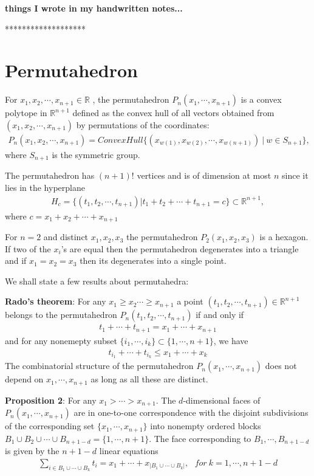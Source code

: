 \documentclass[hidelinks,12pt]{article}
\newcommand{\bea}[1]{\begin{eqnarray}\label{#1} }
\newcommand{\eea}{\end{eqnarray}}
\def\bea{\begin{eqnarray}}
\def\eea{\end{eqnarray}}
\begin{document}
{\bf things I wrote in my handwritten notes...}

*******************

\section*{Permutahedron}
 For $x_1,x_2, \cdots, x_{n+1} \in \mathbb{R} $ , the permutahedron $P_n(x_1,\cdots,x_{n+1})$ is a convex polytope in $\mathbb{R}^{n+1}$ defined as the convex hull of all vectors obtained from $(x_1,x_2, \cdots, x_{n+1})$ by permutations of the coordinates:
 \bea
 P_n(x_1,x_2, \cdots, x_{n+1}) = ConvexHull \{ (x_{w(1)},x_{w(2)}, \cdots, x_{w(n+1)})~ |~ w \in S_{n+1} \}, \nonumber
 \eea
 where $S_{n+1}$ is the symmetric group. 
 
 The permutahedron has $(n+1)!$ vertices and is of dimension at most $n$ since it lies in the hyperplane 
 \bea
 H_c= \{(t_1,t_2, \cdots, t_{n+1}) | t_1 + t_2 + \cdots + t_{n+1}= c \} \subset \mathbb{R}^{n+1}, \nonumber
 \eea
where $c= x_1+x_2+ \cdots +x_{n+1}$

For $n=2$ and distinct $x_1,x_2, x_3$ the permutahedron $P_2(x_1,x_2, x_3)$ is a hexagon. If two of the $x_i$'s are equal then the permutahedron degenerates into a triangle and if $x_1= x_2 = x_3$ then its degenerates into a single point.

We shall state a few results about permutahedra:

{\bf Rado's theorem}: For any $x_1 \ge x_2  \cdots \ge x_{n+1}$ a point $(t_1,t_2, \cdots, t_{n+1}) \in \mathbb{R}^{n+1}$ belongs to the permutahedron $P_n(t_1,t_2, \cdots, t_{n+1})$ if and only if 
\bea
t_1+ \cdots +t_{n+1} = x_1 +\cdots+ x_{n+1} \nonumber
\eea
and for any nonemepty subset $\{i_1,\cdots,i_k \} \subset \{1,\cdots, n+1 \}$, we have 
\bea
t_{i_1}+ \cdots +t_{i_k} \leq x_1 +\cdots+ x_k \nonumber
\eea
The combinatorial structure of the permutahedron $P_n (x_1, \cdots, x_{n+1}) $ does not depend on $ x_1, \cdots, x_{n+1} $ as long as all these are distinct. 

{\bf Proposition 2}: For any  $x_1> \cdots > x_{n+1} $. The $d$-dimensional faces of $P_n ( x_1, \cdots, x_{n+1 })$ are in one-to-one correspondence with the disjoint subdivisions of the corresponding set $\{x_1,\cdots, x_{n+1 }\}$ into nonempty ordered blocks $B_1 \cup B_2 \cup \cdots \cup B_{n+1-d} =\{1,\cdots,n+1 \}$. The face corresponding to $B_1,\cdots, B_{n+1-d}$ is given by the $n+1-d$ linear equations 
\bea
\sum_{i \in B_1\cup \cdots \cup B_k} t_i = x_1 + \cdots +x_{| B_1 \cup \cdots \cup B_k |}, ~~~ for~ k=1,\cdots,n+1-d \nonumber
\eea 
\end{document}
